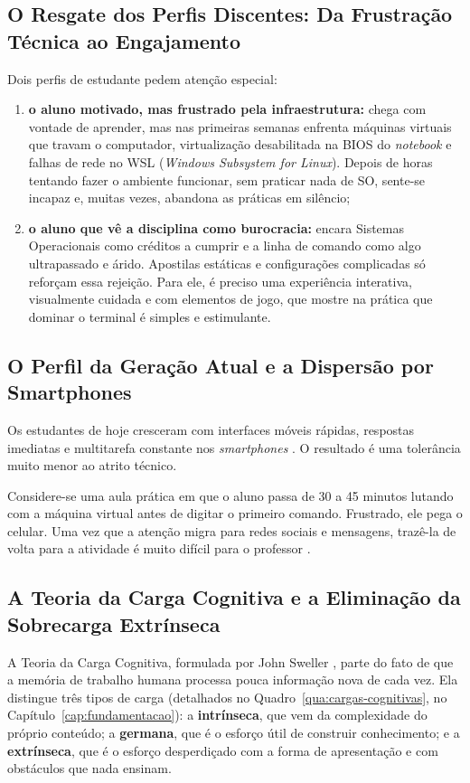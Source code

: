 \subsection{O Resgate dos Perfis Discentes: Da Frustração Técnica ao Engajamento}
Dois perfis de estudante pedem atenção especial:
\begin{enumerate}
    \item \textbf{o aluno motivado, mas frustrado pela infraestrutura:} chega com vontade de aprender, mas nas primeiras semanas enfrenta máquinas virtuais que travam o computador, virtualização desabilitada na BIOS do \textit{notebook} e falhas de rede no WSL (\textit{Windows Subsystem for Linux}). Depois de horas tentando fazer o ambiente funcionar, sem praticar nada de SO, sente-se incapaz e, muitas vezes, abandona as práticas em silêncio;
    \item \textbf{o aluno que vê a disciplina como burocracia:} encara Sistemas Operacionais como créditos a cumprir e a linha de comando como algo ultrapassado e árido. Apostilas estáticas e configurações complicadas só reforçam essa rejeição. Para ele, é preciso uma experiência interativa, visualmente cuidada e com elementos de jogo, que mostre na prática que dominar o terminal é simples e estimulante.
\end{enumerate}

\subsection{O Perfil da Geração Atual e a Dispersão por Smartphones}
Os estudantes de hoje cresceram com interfaces móveis rápidas, respostas imediatas e multitarefa constante nos \textit{smartphones} \cite{kuznekoff2013impact}. O resultado é uma tolerância muito menor ao atrito técnico.

Considere-se uma aula prática em que o aluno passa de 30 a 45 minutos lutando com a máquina virtual antes de digitar o primeiro comando. Frustrado, ele pega o celular. Uma vez que a atenção migra para redes sociais e mensagens, trazê-la de volta para a atividade é muito difícil para o professor \cite{kuznekoff2013impact, silva2021ensino}.

\subsection{A Teoria da Carga Cognitiva e a Eliminação da Sobrecarga Extrínseca}
A Teoria da Carga Cognitiva, formulada por John Sweller \cite{sweller1988cognitive, sweller2011cognitive, paas2003cognitive}, parte do fato de que a memória de trabalho humana processa pouca informação nova de cada vez. Ela distingue três tipos de carga (detalhados no Quadro~\ref{qua:cargas-cognitivas}, no Capítulo~\ref{cap:fundamentacao}): a \textbf{intrínseca}, que vem da complexidade do próprio conteúdo; a \textbf{germana}, que é o esforço útil de construir conhecimento; e a \textbf{extrínseca}, que é o esforço desperdiçado com a forma de apresentação e com obstáculos que nada ensinam.

